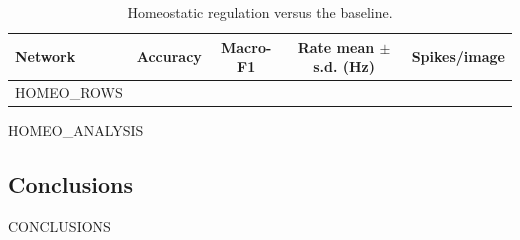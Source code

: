 \documentclass[11pt,a4paper]{article}
\begin{document}
\begin{table}[h]
\centering
\caption{Homeostatic regulation versus the baseline.}
\label{tab:homeo}
\begin{tabular}{lcccc}
\toprule
Network & Accuracy & Macro-F1 & Rate mean $\pm$ s.d. (Hz) & Spikes/image\\
\midrule
HOMEO\_ROWS
\bottomrule
\end{tabular}
\end{table}

HOMEO\_ANALYSIS

\subsection{Conclusions}
CONCLUSIONS
\end{document}
